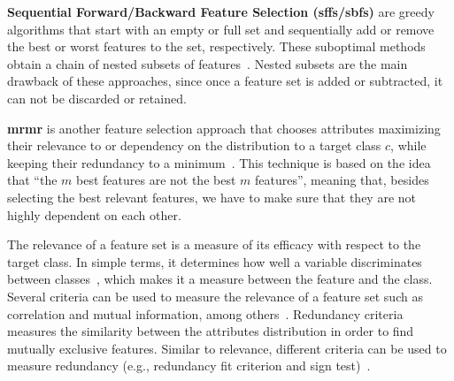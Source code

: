 \begin{description}
\item \textbf{Sequential Forward/Backward Feature Selection (\ac{sffs}/\ac{sbfs})} are greedy algorithms that start with an empty or full set and sequentially add or remove the best or worst features to the set, respectively.
These suboptimal methods obtain a chain of nested subsets of features~\cite{ferri1994comparative}.
Nested subsets are the main drawback of these approaches, since once a feature set is added or subtracted, it can not be discarded or retained.

\item \textbf{\acf{mrmr}} is another feature selection approach that chooses attributes maximizing their relevance to or dependency on the distribution to a target class $c$, while keeping their redundancy to a minimum~\cite{peng2005feature}.
This technique is based on the idea that ``the $m$ best features are not the best $m$ features'', meaning that, besides selecting the best relevant features, we have to make sure that they are not highly dependent on each other. 

The relevance of a feature set is a measure of its efficacy with respect to the target class.
In simple terms, it determines how well a variable discriminates between classes~\cite{auffarth2010comparison}, which makes it a measure between the feature and the class. 
Several criteria can be used to measure the relevance of a feature set such as correlation and mutual information, among others~\cite{auffarth2010comparison}. 
Redundancy criteria measures the similarity between the attributes distribution in order to find mutually exclusive features. 
Similar to relevance, different criteria can be used to measure redundancy (e.g., redundancy fit criterion and sign test)~\cite{auffarth2010comparison}.


\end{description}
